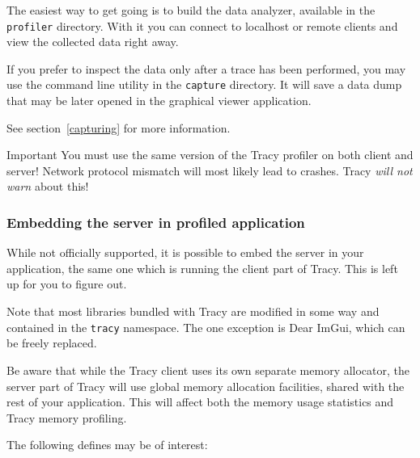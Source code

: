 \documentclass[hidelinks,titlepage,a4paper]{article}
\begin{document}
The easiest way to get going is to build the data analyzer, available in the \texttt{profiler} directory. With it you can connect to localhost or remote clients and view the collected data right away.

If you prefer to inspect the data only after a trace has been performed, you may use the command line utility in the \texttt{capture} directory. It will save a data dump that may be later opened in the graphical viewer application.

See section~\ref{capturing} for more information.

\begin{bclogo}[
noborder=true,
couleur=black!5,
logo=\bcbombe
]{Important}
You must use the same version of the Tracy profiler on both client and server! Network protocol mismatch will most likely lead to crashes. Tracy \emph{will not warn} about this!
\end{bclogo}

\subsubsection{Embedding the server in profiled application}
\label{embeddingserver}

While not officially supported, it is possible to embed the server in your application, the same one which is running the client part of Tracy. This is left up for you to figure out.

Note that most libraries bundled with Tracy are modified in some way and contained in the \texttt{tracy} namespace. The one exception is Dear ImGui, which can be freely replaced.

Be aware that while the Tracy client uses its own separate memory allocator, the server part of Tracy will use global memory allocation facilities, shared with the rest of your application. This will affect both the memory usage statistics and Tracy memory profiling.

The following defines may be of interest:
\end{document}
